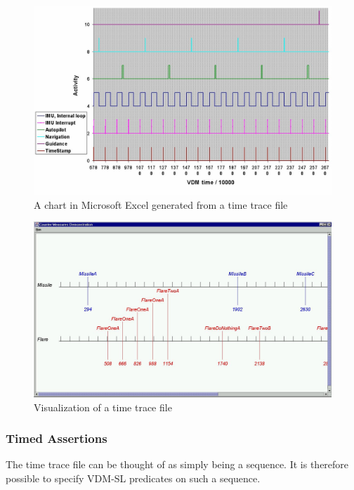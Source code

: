\documentclass{overturerepchap}
\begin{document}
\begin{figure}
\begin{center}
\includegraphics[width=\textwidth]{figures/analysismissile.jpg}
\end{center}
\caption{A chart in Microsoft Excel generated from a time trace file\label{fig:chartExcel}}
\end{figure}

\begin{figure}
\begin{center}
\includegraphics[width=\textwidth]{figures/bespokemissile.jpg}
\end{center}
\caption{Visualization of a time trace file\label{fig:vistrace}}
\end{figure}

\subsubsection{Timed Assertions}

The time trace file can be thought of as simply being a sequence. It
is therefore possible to specify VDM-SL predicates on such a sequence.
\end{document}
